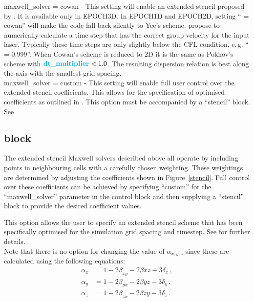 {\emphtext maxwell\_solver = cowan} - This setting will enable an extended
stencil proposed by \citet{Cowan2013}. It is available only in EPOCH3D. In
EPOCH1D and EPOCH2D, setting `` = cowan'' will make
the code fall back silently to Yee's scheme.
\citet{Cowan2013} propose to numerically calculate a time step that has the
correct group velocity for the input laser. Typically these time
steps are only slightly below the CFL condition, e.\,g.
`` = 0.999''.
When Cowan's scheme is reduced to 2D it is the same as Pokhov's scheme with
$\inlineemph{dt\_multiplier}<1.0$.
The resulting dispersion relation is best along the axis with the smallest grid
spacing.\\

{\emphtext maxwell\_solver = custom} - This setting will enable full user
control over the extended stencil coefficients. This allows for the
specification of optimised coefficients as outlined in \citet{Blinne2017}.
This option must be accompanied by a ``stencil'' block.
See~\\


\subsection{\texorpdfstring
  { block}
  {           {stencil} block}}
\label{sec:stencil_block}

The extended stencil Maxwell solvers described above all operate by
including points in neighbouring cells with a carefully chosen weighting.
These weightings are determined by adjusting the coefficients shown in
Figure~\ref{stencil}. Full control over these coefficients can be
achieved by specifying ``custom'' for the ``maxwell\_solver'' parameter
in the control block and then supplying a ``stencil'' block to provide
the desired coefficient values.

This option allows the user to specify an extended stencil scheme that
has been specifically optimised for the simulation grid spacing and timestep.
See \citet{Blinne2017} for further details.\\

Note that there is no option for changing the value of $\alpha_{x,y,z}$ since
these are calculated using the following  equations:
\begin{align*}
  \alpha_x &= 1 - 2\beta_{xy} - 2\beta{xz} - 3\delta_x\,, \\
  \alpha_y &= 1 - 2\beta_{yx} - 2\beta{yz} - 3\delta_y\,, \\
  \alpha_z &= 1 - 2\beta_{zx} - 2\beta{zy} - 3\delta_z\,.
\end{align*}

